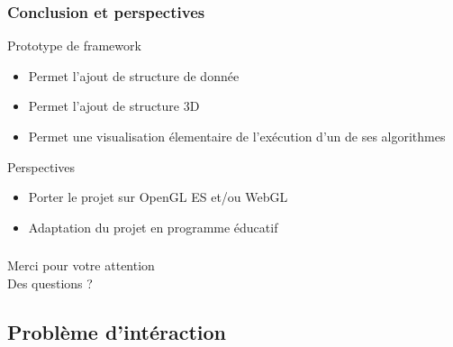 \documentclass[handout]{beamer}
\begin{document}
\begin{frame}
  \frametitle{Conclusion et perspectives}
  \begin{block}{Prototype de framework}
    \begin{itemize}
    \item Permet l'ajout de structure de donnée
    \item Permet l'ajout de structure 3D
    \item Permet une visualisation élementaire de l'exécution d'un de ses algorithmes
    \end{itemize}
  \end{block}

  \begin{block}{Perspectives}
    \begin{itemize}
    \item Porter le projet sur OpenGL ES et/ou WebGL
    \item Adaptation du projet en programme éducatif
    \end{itemize}
  \end{block}

\end{frame}

\begin{frame}
  \frametitle{}

  \begin{block}{}
    \begin{center}
      Merci pour votre attention\\
      Des questions ?
    \end{center}
  \end{block}
\end{frame}

\subsection{Problème d'intéraction}
\end{document}
